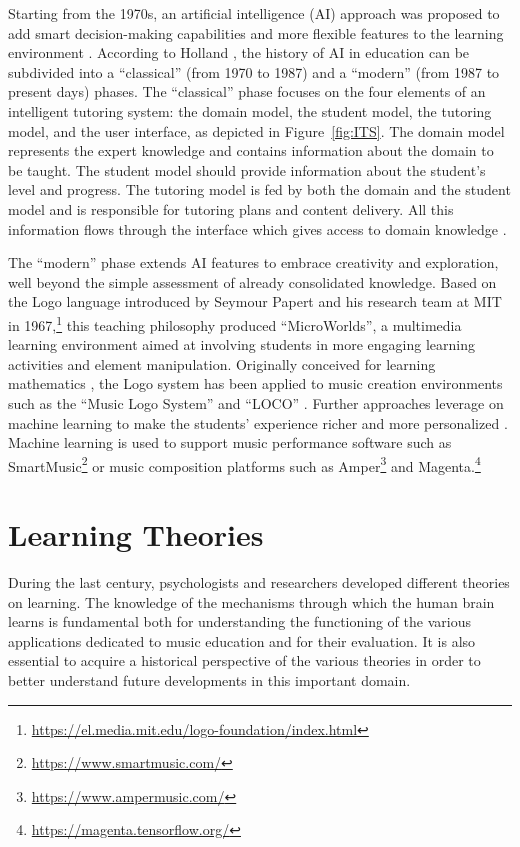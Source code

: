 \documentclass[journal]{IEEEtran}
\begin{document}
Starting from the 1970s, an artificial intelligence (AI) approach was proposed to add smart decision-making capabilities and more flexible features to the learning environment \cite{carbonell1970ai}. 
According to Holland \cite{holland2000artificial}, the history of AI in education
can be subdivided into a ``classical'' (from 1970 to 1987) and a ``modern'' (from 1987 to present days) phases. The ``classical'' phase focuses on the four elements of an intelligent tutoring system: the domain model, the student model, the tutoring model, and the user interface, as depicted in Figure~\ref{fig:ITS}. The domain model represents the expert knowledge and contains information about the domain to be taught. The student model should provide information about the student's level and progress. The tutoring model is fed by both the domain and the student model and is responsible for tutoring plans and content delivery. All this information flows through the interface which gives access to domain knowledge \cite{nkambou2010advances}. 

The ``modern'' phase extends AI features to embrace creativity and exploration, well beyond the simple assessment of already consolidated knowledge. Based on the Logo language introduced by Seymour Papert and his research team at MIT in  1967,\footnote{\url{https://el.media.mit.edu/logo-foundation/index.html}} this teaching philosophy produced ``MicroWorlds'', a multimedia learning environment aimed at involving students in more engaging learning activities and element manipulation. Originally conceived for learning mathematics \cite{edwards1995design}, the Logo system has been applied to music creation environments such as the ``Music Logo System'' \cite{bamberger1979} and ``LOCO'' \cite{desain1988}. Further approaches leverage on machine learning to make the students' experience richer and more personalized \cite{delgado2013learning}. Machine learning is used to support music performance software such as SmartMusic\footnote{\url{https://www.smartmusic.com/}} or music composition platforms such as Amper\footnote{\url{https://www.ampermusic.com/}} and Magenta.\footnote{\url{https://magenta.tensorflow.org/}}



\section{Learning Theories}
\label{sec:theoryback}

During the last century, psychologists and researchers developed different theories on learning. The knowledge of the mechanisms through which the human brain learns is fundamental both for understanding the functioning of the various applications dedicated to music education and for their evaluation. It is also essential to acquire a historical perspective of the various theories in order to better understand future developments in this important domain. 
\end{document}
